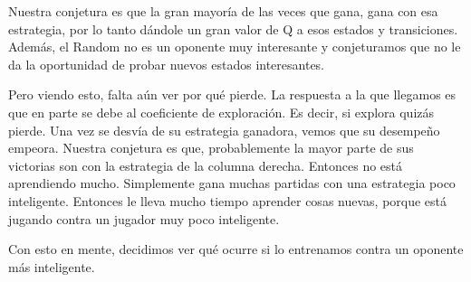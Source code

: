 Nuestra conjetura es que la gran mayoría de las veces que gana, gana con esa estrategia, por lo tanto dándole un gran valor de Q a esos estados y transiciones. Además, el Random no es un oponente muy interesante y conjeturamos que no le da la oportunidad de probar nuevos estados interesantes.

Pero viendo esto, falta aún ver por qué pierde. La respuesta a la que llegamos es que en parte se debe al coeficiente de exploración. Es decir, si explora quizás pierde. Una vez se desvía de su estrategia ganadora, vemos que su desempeño empeora. Nuestra conjetura es que, probablemente la mayor parte de sus victorias son con la estrategia de la columna derecha. Entonces no está aprendiendo mucho. Simplemente gana muchas partidas con una estrategia poco inteligente. Entonces le lleva mucho tiempo aprender cosas nuevas, porque está jugando contra un jugador muy poco inteligente.

Con esto en mente, decidimos ver qué ocurre si lo entrenamos contra un oponente más inteligente.
